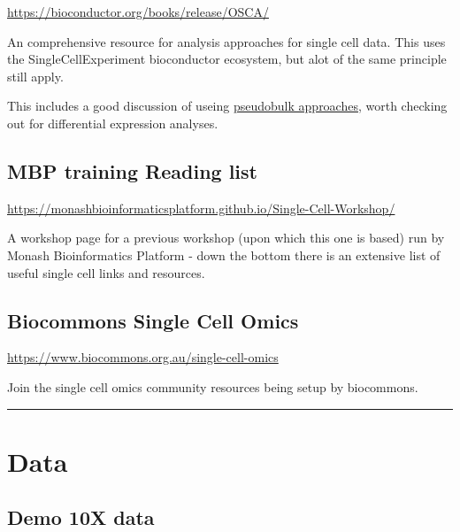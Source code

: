 \documentclass[
]{book}
\begin{document}
\url{https://bioconductor.org/books/release/OSCA/}

An comprehensive resource for analysis approaches for single cell data.
This uses the SingleCellExperiment bioconductor ecosystem, but alot of the same principle still apply.

This includes a good discussion of useing \href{http://bioconductor.org/books/3.15/OSCA.multisample/multi-sample-comparisons.html\#creating-pseudo-bulk-samples}{pseudobulk approaches}, worth checking out for differential expression analyses.

\hypertarget{mbp-training-reading-list}{%
\subsection*{MBP training Reading list}\label{mbp-training-reading-list}}

\url{https://monashbioinformaticsplatform.github.io/Single-Cell-Workshop/}

A workshop page for a previous workshop (upon which this one is based) run by Monash Bioinformatics Platform - down the bottom there
is an extensive list of useful single cell links and resources.

\hypertarget{biocommons-single-cell-omics}{%
\subsection*{Biocommons Single Cell Omics}\label{biocommons-single-cell-omics}}

\url{https://www.biocommons.org.au/single-cell-omics}

Join the single cell omics community resources being setup by biocommons.

\begin{center}\rule{0.5\linewidth}{0.5pt}\end{center}

\hypertarget{data}{%
\section{Data}\label{data}}

\hypertarget{demo-10x-data}{%
\subsection*{Demo 10X data}\label{demo-10x-data}}
\end{document}
